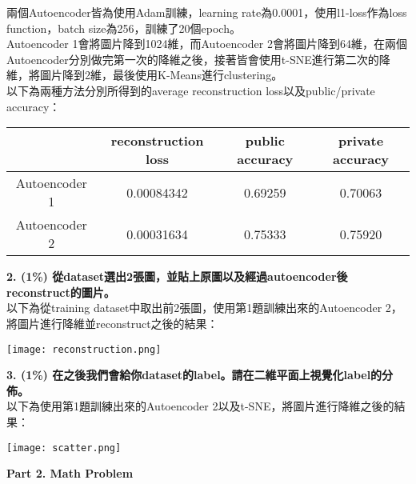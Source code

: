 \documentclass{article}
\begin{document}
\bigskip

兩個Autoencoder皆為使用Adam訓練，learning rate為0.0001，使用l1-loss作為loss function，batch size為256，訓練了20個epoch。\\

Autoencoder 1會將圖片降到1024維，而Autoencoder 2會將圖片降到64維，在兩個Autoencoder分別做完第一次的降維之後，接著皆會使用t-SNE進行第二次的降維，將圖片降到2維，最後使用K-Means進行clustering。\\

以下為兩種方法分別所得到的average reconstruction loss以及public/private accuracy：

\begin{center}
    \begin{tabular}{|c|c|c|c|}
        \hline
        & reconstruction loss & public accuracy & private accuracy\\
        \hline
        Autoencoder 1 & 0.00084342 & 0.69259 & 0.70063\\
        \hline
        Autoencoder 2 & 0.00031634 & 0.75333 & 0.75920\\
        \hline
    \end{tabular}
\end{center}

\bigskip

\noindent
{\bf 2. (1\%) 從dataset選出2張圖，並貼上原圖以及經過autoencoder後reconstruct的圖片。}\\

以下為從training dataset中取出前2張圖，使用第1題訓練出來的Autoencoder 2，將圖片進行降維並reconstruct之後的結果：

\begin{center}
    \texttt{[image: reconstruction.png]}\\
\end{center}

\noindent
{\bf 3. (1\%) 在之後我們會給你dataset的label。請在二維平面上視覺化label的分佈。}\\

以下為使用第1題訓練出來的Autoencoder 2以及t-SNE，將圖片進行降維之後的結果：

\begin{center}
    \texttt{[image: scatter.png]}\\
\end{center}

\bigskip

\noindent
{\bf \LARGE Part 2. Math Problem}\\
\end{document}
